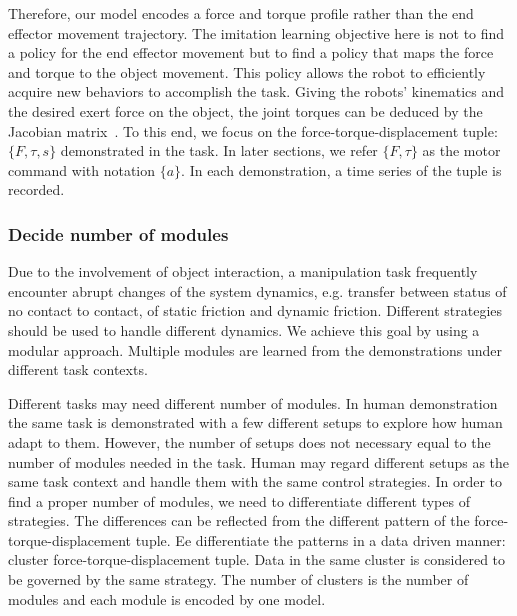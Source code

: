 Therefore, our model encodes a force and torque profile rather than the end effector movement trajectory. The imitation learning objective here is not to find a policy for the end effector movement but to find a policy that maps the force and torque to the object movement. This policy allows the robot to efficiently acquire new behaviors to accomplish the task. %
Giving the robots' kinematics and the desired exert force on the object, the joint torques can be deduced by the Jacobian matrix~\cite{okamura2000overview}. To this end, we focus on the force-torque-displacement tuple: $\{F,\tau,s\}$ demonstrated in the task. In later sections, we refer $\{F,\tau\}$ as the motor command with notation $\{a\}$. In each demonstration, a time series of the tuple is recorded.



\subsubsection{Decide number of modules}
\label{sec:cluster}

Due to the involvement of object interaction, a manipulation task frequently encounter abrupt changes of the system dynamics, e.g. transfer between status of no contact to contact, of static friction and dynamic friction. Different strategies should be used to handle different dynamics. We achieve this goal by using a modular approach. Multiple modules are learned from the demonstrations under different task contexts. %


Different tasks may need different number of modules. In human demonstration the same task is demonstrated with a few different setups to explore how human adapt to them. However, the number of setups does not necessary equal to the number of modules needed in the task. Human may regard different setups as the same task context and handle them with the same control strategies. %
In order to find a proper number of modules, we need to differentiate different types of strategies. The differences can be reflected from the different pattern of the force-torque-displacement tuple. Ee differentiate the patterns in a data driven manner: cluster force-torque-displacement tuple. Data in the same cluster is considered to be governed by the same strategy. The number of clusters is the number of modules and each module is encoded by one model.


